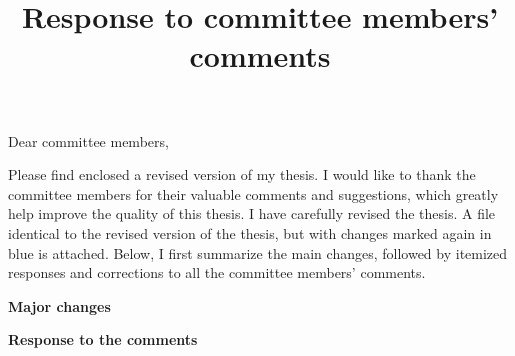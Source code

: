 \documentclass[aps,prl,reprint,showpacs,floatfix,superscriptaddress, onecolumn, 12pt]{revtex4-2}
\newcommand{\blue}[1]{{\color{blue}{#1}}} %
\begin{document}

\title{Response to committee members' comments}
\author{}

\maketitle

\noindent Dear committee members,

Please find enclosed a revised version of my thesis. I would like to thank the committee members for their valuable comments and suggestions, which greatly help improve the quality of this thesis. I have carefully revised the thesis. A file identical to the revised version of the thesis, but with changes marked again in blue is attached. Below, I first summarize the main changes, followed by itemized responses and corrections to all the committee members' comments.


\vspace{1em}

\textbf{Major changes}

\blue{
    \begin{enumerate}
        \item 
    \end{enumerate}
}

\vspace{1em}

\textbf{Response to the comments}
\end{document}
